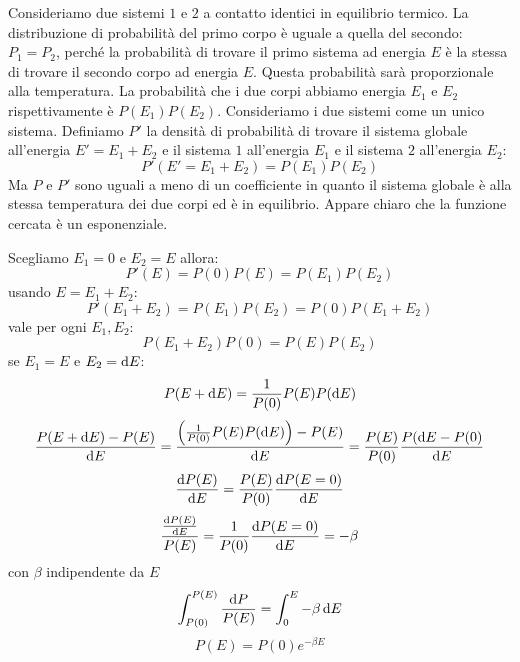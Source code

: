 Consideriamo due sistemi $1$ e $2$ a contatto identici in equilibrio termico. La distribuzione di probabilità del primo corpo è uguale a quella del secondo: $P_1=P_2$, perché la probabilità di trovare il primo sistema ad energia $E$ è la stessa di trovare il secondo corpo ad energia $E$. Questa probabilità sarà proporzionale alla temperatura. La probabilità che i due corpi abbiamo energia $E_1$ e $E_2$ rispettivamente è $P(E_1)P(E_2)$. Consideriamo i due sistemi come un unico sistema. Definiamo $P'$ la densità di probabilità di trovare il sistema globale all'energia $E'=E_1+E_2$ e il sistema $1$ all'energia $E_1$ e il sistema $2$ all'energia $E_2$:
\begin{equation}
	P'(E'=E_1+E_2)=P(E_1)P(E_2)
\end{equation}
Ma $P$ e $P'$ sono uguali a meno di un coefficiente in quanto il sistema globale è alla stessa temperatura dei due corpi ed è in equilibrio. Appare chiaro che la funzione cercata è un esponenziale.

Scegliamo $E_1=0$ e $E_2=E$ allora:
\[
	P'(E)=P(0)P(E)=P(E_1)P(E_2)
\]
usando $E=E_1+E_2$:
\[
	P'(E_1+E_2)=P(E_1)P(E_2)=P(0)P(E_1+E_2)
\]
vale per ogni $E_1,E_2$:
\[
	P(E_1+E_2)P(0)=P(E)P(E_2)
\]
se $E_1=E$ e $E_2=\mathrm{d} E$:
\[
	P(E+\mathrm{d} E)=\frac{1}{P(0)}P(E)P(\mathrm{d} E)
\]
\[
	\frac{P(E+\mathrm{d} E)-P(E)}{\mathrm{d} E}=\frac{\left(\frac{1}{P(0)}P(E)P(\mathrm{d} E)\right)-P(E)}{\mathrm{d} E}=\frac{P(E)}{P(0)}\frac{P(\mathrm{d} E-P(0)}{\mathrm{d} E}
\]
\[
	\frac{\mathrm{d} P(E)}{\mathrm{d} E}=\frac{P(E)}{P(0)}\frac{\mathrm{d} P(E=0)}{\mathrm{d} E}
\]
\[
	\frac{\frac{\mathrm{d} P(E)}{\mathrm{d} E}}{P(E)}=\frac{1}{P(0)}\frac{\mathrm{d} P(E=0)}{\mathrm{d} E}=-\beta
\]
con $\beta$ indipendente da $E$
\[
	\int_{P(0)}^{P(E)}\frac{\mathrm{d} P}{P(E)}=\int_0^E-\beta\,\mathrm{d} E
\]
\begin{equation}
	P(E)=P(0)e^{-\beta E}
\end{equation}
